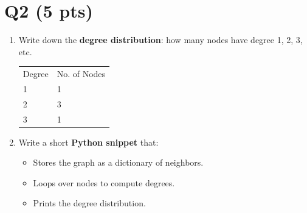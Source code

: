 \documentclass{article}
\begin{document}
\section*{Q2 (5 pts)}

\begin{enumerate}
    \item {
        Write down the \textbf{degree distribution}: how many nodes have degree 1, 2, 3, etc.

        \begin{table}[htbp]
            \centering
            \begin{tabular}{ll}
                Degree & No. of Nodes \\
                1 & 1 \\
                2 & 3 \\
                3 & 1 \\

            \end{tabular}
        \end{table}
    }

    \item {
        Write a short \textbf{Python snippet} that:
        \begin{itemize}
            \item Stores the graph as a dictionary of neighbors.
            \item Loops over nodes to compute degrees.
            \item Prints the degree distribution.
        \end{itemize}

                
    }
\end{enumerate}
\end{document}
